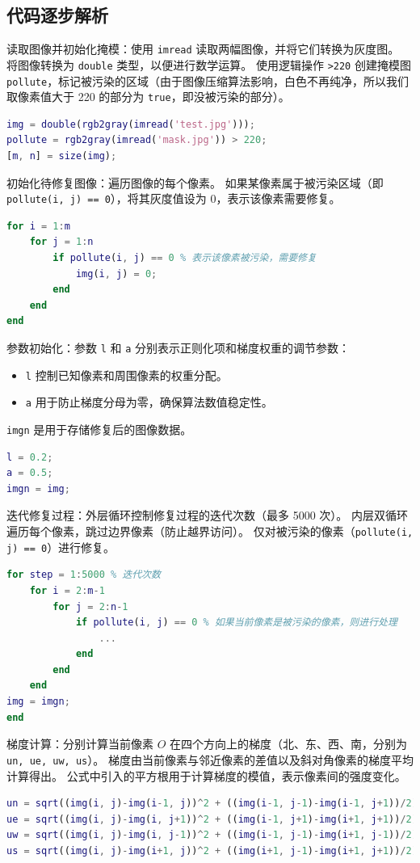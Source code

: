 \documentclass[UTF8]{ctexart}
\begin{document}
\subsection{代码逐步解析}

读取图像并初始化掩模：使用 \texttt{imread} 读取两幅图像，并将它们转换为灰度图。
将图像转换为 \texttt{double} 类型，以便进行数学运算。
使用逻辑操作 \texttt{>220} 创建掩模图 \texttt{pollute}，标记被污染的区域（由于图像压缩算法影响，白色不再纯净，所以我们取像素值大于 220 的部分为 \texttt{true}，即没被污染的部分）。
\begin{lstlisting}[language=Matlab]
img = double(rgb2gray(imread('test.jpg')));
pollute = rgb2gray(imread('mask.jpg')) > 220;
[m, n] = size(img);
\end{lstlisting}

初始化待修复图像：遍历图像的每个像素。
如果某像素属于被污染区域（即 \texttt{pollute(i, j) == 0}），将其灰度值设为 0，表示该像素需要修复。
\begin{lstlisting}[language=Matlab]
for i = 1:m
    for j = 1:n
        if pollute(i, j) == 0 % 表示该像素被污染，需要修复
            img(i, j) = 0; 
        end
    end
end
\end{lstlisting}

参数初始化：参数 \texttt{l} 和 \texttt{a} 分别表示正则化项和梯度权重的调节参数：
\begin{itemize}
    \item \texttt{l} 控制已知像素和周围像素的权重分配。
    \item \texttt{a} 用于防止梯度分母为零，确保算法数值稳定性。
\end{itemize}
\texttt{imgn} 是用于存储修复后的图像数据。
\begin{lstlisting}[language=Matlab]
l = 0.2;
a = 0.5;
imgn = img;
\end{lstlisting}

迭代修复过程：外层循环控制修复过程的迭代次数（最多 5000 次）。
内层双循环遍历每个像素，跳过边界像素（防止越界访问）。
仅对被污染的像素（\texttt{pollute(i, j) == 0}）进行修复。
\begin{lstlisting}[language=Matlab]
for step = 1:5000 % 迭代次数
    for i = 2:m-1
        for j = 2:n-1
            if pollute(i, j) == 0 % 如果当前像素是被污染的像素，则进行处理
                ...
            end
        end
    end
img = imgn;
end
\end{lstlisting}

梯度计算：分别计算当前像素 $O$ 在四个方向上的梯度（北、东、西、南，分别为 \texttt{un, ue, uw, us}）。
梯度由当前像素与邻近像素的差值以及斜对角像素的梯度平均计算得出。
公式中引入的平方根用于计算梯度的模值，表示像素间的强度变化。
\begin{lstlisting}[language=Matlab]
un = sqrt((img(i, j)-img(i-1, j))^2 + ((img(i-1, j-1)-img(i-1, j+1))/2)^2);
ue = sqrt((img(i, j)-img(i, j+1))^2 + ((img(i-1, j+1)-img(i+1, j+1))/2)^2);
uw = sqrt((img(i, j)-img(i, j-1))^2 + ((img(i-1, j-1)-img(i+1, j-1))/2)^2);
us = sqrt((img(i, j)-img(i+1, j))^2 + ((img(i+1, j-1)-img(i+1, j+1))/2)^2);
\end{lstlisting}
\end{document}
